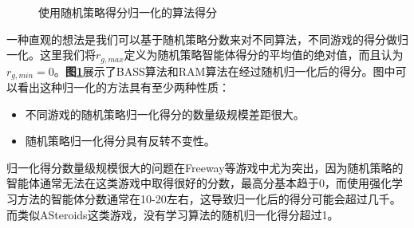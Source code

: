 \begin{figure}[!t]
	\centering
	
	\caption{使用随机策略得分归一化的算法得分}
	\label{Fig: random-normalized, baseline and inter-algorithm scores.}
\end{figure}


一种直观的想法是我们可以基于随机策略分数来对不同算法，不同游戏的得分做归一化。这里我们将$r_{g,max}$定义为随机策略智能体得分的平均值的绝对值，而且认为$r_{g,min}=0$。\textbf{图\ref{Fig: random-normalized, baseline and inter-algorithm scores.}}展示了BASS算法和RAM算法在经过随机归一化后的得分。图中可以看出这种归一化的方法具有至少两种性质：
\begin{itemize}
    \item 不同游戏的随机策略归一化得分的数量级规模差距很大。
    \item 随机策略归一化得分具有反转不变性。
\end{itemize}
归一化得分数量级规模很大的问题在Freeway等游戏中尤为突出，因为随机策略的智能体通常无法在这类游戏中取得很好的分数，最高分基本趋于0，而使用强化学习方法的智能体分数通常在10-20左右，这导致归一化后的得分可能会超过几千。而类似ASteroids这类游戏，没有学习算法的随机归一化得分超过1。


